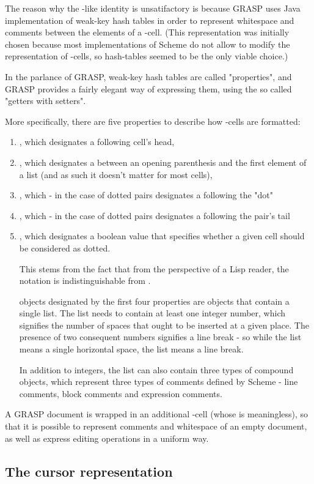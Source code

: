 \documentclass[11pt]{article}
\begin{document}
The reason why the -like identity is unsatifactory
is because GRASP uses Java implementation of weak-key
hash tables in order to represent whitespace and comments
between the elements of a -cell. (This
representation was initially chosen because most implementations
of Scheme do not allow to modify the representation of 
-cells, so hash-tables seemed to be the only
viable choice.)

In the parlance of GRASP, weak-key hash tables are called
"properties", and GRASP provides a fairly elegant way
of expressing them, using the so called "getters with setters".

More specifically, there are five properties to describe
how -cells are formatted: 
\begin{enumerate}
\item , which designates a
following cell's head,
\item , which designates 
a between an opening parenthesis 
and the first element of a list (and as such it doesn't
matter for most cells),
\item , which - in the case of dotted pairs
designates a following the "dot"
\item , which - in the case of dotted pairs
designates a following the pair's tail
\item , which designates a boolean value that
specifies whether a given cell should be considered as dotted.

This stems from the fact that from the perspective
of a Lisp reader, the notation 
is indistinguishable from .

objects designated by the first four properties
are objects that contain a single list. The list needs
to contain at least one integer number, which signifies
the number of spaces that ought to be inserted at a given
place. The presence of two consequent numbers signifies
a line break - so while the list means a single
horizontal space, the list means a line break.

In addition to integers, the list can also contain
three types of compound objects, which represent
three types of comments defined by Scheme - line comments,
block comments and expression comments.
\end{enumerate}

A GRASP document is wrapped in an additional -cell
(whose is meaningless), so that it is possible
to represent comments and whitespace of an empty document,
as well as express editing operations in a uniform way.

\subsection{The cursor representation}
\label{sec:org64733a7}
\end{document}
